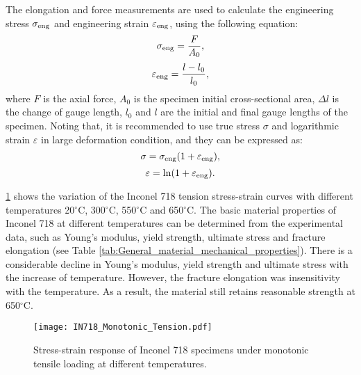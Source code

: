 The elongation and force measurements are used to calculate the engineering stress $\sigma_{\rm eng}$ and engineering strain $\varepsilon_{\rm eng}$, using the following equation:
\begin{equation}
\sigma_{\rm eng}=\frac{F}{A_0},
\end{equation}
\begin{equation}
\varepsilon_{\rm eng}=\frac{l-l_0}{l_0},
\end{equation}
where $F$ is the axial force, $A_0$ is the specimen initial cross-sectional area, $\Delta l$ is the change of gauge length, $l_0$ and $l$ are the initial and final gauge lengths of the specimen.
Noting that, it is recommended to use true stress $\sigma$ and logarithmic strain $\varepsilon$ in large deformation condition, and they can be expressed as:
\begin{equation}
\sigma=\sigma_{\rm eng}(1+\varepsilon_{\rm eng}),
\end{equation}
\begin{equation}
\varepsilon=\ln(1+\varepsilon_{\rm eng}).
\end{equation}

\ref{Fig:IN718_Monotonic_Tension} shows the variation of the Inconel 718 tension stress-strain curves with different temperatures 20$^{\circ}$C, 300$^{\circ}$C, 550$^{\circ}$C and 650$^{\circ}$C.
The basic material properties of Inconel 718 at different temperatures can be determined from the experimental data, such as Young's modulus, yield strength, ultimate stress and fracture elongation (see Table \ref{tab:General_material_mechanical_properties}).
There is a considerable decline in Young's modulus, yield strength and ultimate stress with the increase of temperature.
However, the fracture elongation was insensitivity with the temperature.
As a result, the material still retains reasonable strength at 650$^{\circ}$C.

\begin{figure}[!htp]
  \centering
  \texttt{[image: IN718\_Monotonic\_Tension.pdf]}
  \caption{Stress-strain response of Inconel 718 specimens under monotonic tensile loading at different temperatures.}
  \label{Fig:IN718_Monotonic_Tension}
\end{figure}

